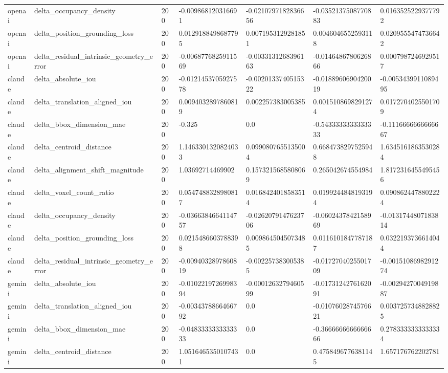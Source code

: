 \begin{tabular}{lllllll}
openai & delta\_occupancy\_density & 200 & -0.009868120316691 & -0.0210797182836656 & -0.0352137508770883 & 0.0163525229377792 \\
openai & delta\_position\_grounding\_loss & 200 & 0.0129188498687795 & 0.0071953129281851 & 0.0046046552593118 & 0.0209555474736642 \\
openai & delta\_residual\_intrinsic\_geometry\_error & 200 & -0.0068776825911569 & -0.0033131268396163 & -0.0146486780626866 & 0.0007987246929517 \\
claude & delta\_absolute\_iou & 200 & -0.0121453705927578 & -0.0020133740515322 & -0.0188960690420019 & -0.0053439911089495 \\
claude & delta\_translation\_aligned\_iou & 200 & 0.0094032897860819 & 0.002257383005385 & 0.0015108698291274 & 0.0172704025501709 \\
claude & delta\_bbox\_dimension\_mae & 200 & -0.325 & 0.0 & -0.5433333333333333 & -0.1116666666666667 \\
claude & delta\_centroid\_distance & 200 & 1.1463301320824033 & 0.0990807655135004 & 0.6684738297525948 & 1.6345161863530284 \\
claude & delta\_alignment\_shift\_magnitude & 200 & 1.03692714469902 & 0.1573215685808069 & 0.265042674554984 & 1.8172316455495456 \\
claude & delta\_voxel\_count\_ratio & 200 & 0.0547488328980817 & 0.0168424018583514 & 0.0199244848193194 & 0.0908624478802224 \\
claude & delta\_occupancy\_density & 200 & -0.0366384664114757 & -0.0262079147623706 & -0.0602437842158969 & -0.0131744807183814 \\
claude & delta\_position\_grounding\_loss & 200 & 0.0215486603788398 & 0.0098645045073485 & 0.0116101847787187 & 0.0322193736614044 \\
claude & delta\_residual\_intrinsic\_geometry\_error & 200 & -0.0094032897860819 & -0.002257383005385 & -0.0172704025501709 & -0.0015108698291274 \\
gemini & delta\_absolute\_iou & 200 & -0.0102219726998394 & -0.0001263279460599 & -0.0173124276162091 & -0.0029427004919887 \\
gemini & delta\_translation\_aligned\_iou & 200 & -0.0034378866466792 & 0.0 & -0.0107602874576621 & 0.0037257348828825 \\
gemini & delta\_bbox\_dimension\_mae & 200 & -0.0483333333333333 & 0.0 & -0.3666666666666666 & 0.2783333333333334 \\
gemini & delta\_centroid\_distance & 200 & 1.0516465350107431 & 0.0 & 0.4758496776381145 & 1.657176762202781 \\

\end{tabular}
